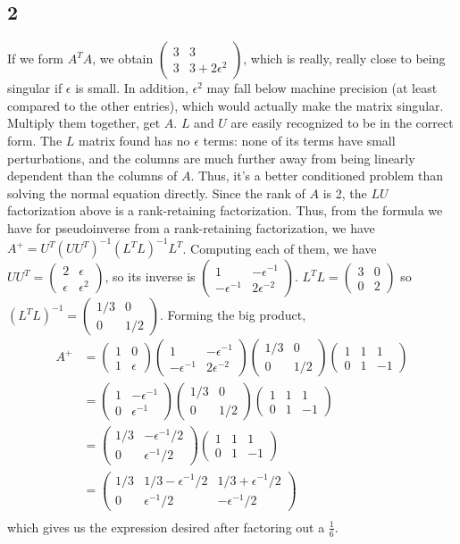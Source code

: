 \documentclass{article}
\newcommand{\ep}{\epsilon}
\newcommand{\openm}{\begin{pmatrix}}
\newcommand{\closem}{\end{pmatrix}}
\begin{document}
\subsection*{2}
If we form $A^TA$, we obtain $\openm3&3\\3&3+2\ep^2\closem$, which is really, really close to being singular if $\ep$ is small. In addition, $\ep^2$ may fall below machine precision (at least compared to the other entries), which would actually make the matrix singular.
Multiply them together, get $A$. $L$ and $U$ are easily recognized to be in the correct form.
The $L$ matrix found has no $\ep$ terms: none of its terms have small perturbations, and the columns are much further away from being linearly dependent than the columns of $A$. Thus, it's a better conditioned problem than solving the normal equation directly.
Since the rank of $A$ is 2, the $LU$ factorization above is a rank-retaining factorization. Thus, from the formula we have for pseudoinverse from a rank-retaining factorization, we have $A^+=U^T(UU^T)^{-1}(L^TL)^{-1}L^T$. Computing each of them, we have $UU^T=\openm2&\ep\\\ep&\ep^2\closem$, so its inverse is $\openm1&-\ep^{-1}\\-\ep^{-1}&2\ep^{-2}\closem$. $L^TL=\openm3&0\\0&2\closem$ so $(L^TL)^{-1}=\openm1/3&0\\0&1/2\closem$. Forming the big product, 
\begin{align*}
    A^+&=\openm1&0\\1&\ep\closem\openm1&-\ep^{-1}\\-\ep^{-1}&2\ep^{-2}\closem\openm1/3&0\\0&1/2\closem\openm1&1&1\\0&1&-1\closem\\
       &=\openm1&-\ep^{-1}\\0&\ep^{-1}\closem\openm1/3&0\\0&1/2\closem\openm1&1&1\\0&1&-1\closem\\
       &=\openm1/3&-\ep^{-1}/2\\0&\ep^{-1}/2\closem\openm1&1&1\\0&1&-1\closem\\
       &=\openm1/3&1/3-\ep^{-1}/2&1/3+\ep^{-1}/2\\0&\ep^{-1}/2&-\ep^{-1}/2\closem\\
\end{align*}
which gives us the expression desired after factoring out a $\frac{1}{6}$.
\end{document}
